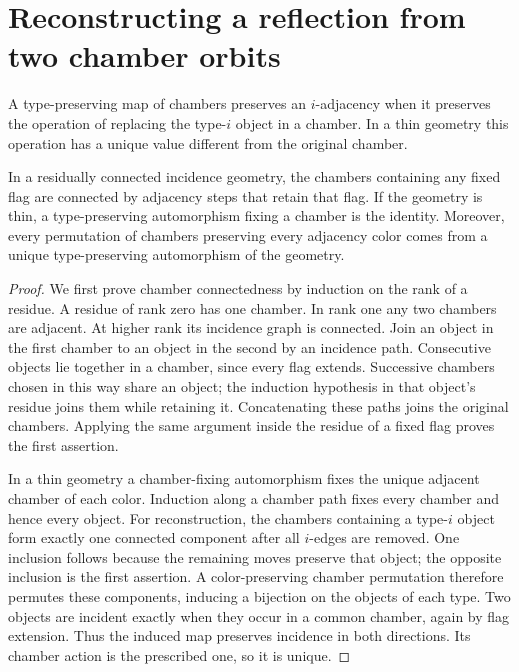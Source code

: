 \section{Reconstructing a reflection from two chamber orbits}
\label{sec:chambers}
A type-preserving map of chambers preserves an $i$-adjacency when it preserves the operation of replacing the type-$i$ object in a chamber. In a thin geometry this operation has a unique value different from the original chamber.

\begin{lemma}\label{lem:propagation}
In a residually connected incidence geometry, the chambers containing any fixed flag are connected by adjacency steps that retain that flag. If the geometry is thin, a type-preserving automorphism fixing a chamber is the identity. Moreover, every permutation of chambers preserving every adjacency color comes from a unique type-preserving automorphism of the geometry.
\end{lemma}
\begin{proof}
We first prove chamber connectedness by induction on the rank of a residue. A residue of rank zero has one chamber. In rank one any two chambers are adjacent. At higher rank its incidence graph is connected. Join an object in the first chamber to an object in the second by an incidence path. Consecutive objects lie together in a chamber, since every flag extends. Successive chambers chosen in this way share an object; the induction hypothesis in that object's residue joins them while retaining it. Concatenating these paths joins the original chambers. Applying the same argument inside the residue of a fixed flag proves the first assertion.

In a thin geometry a chamber-fixing automorphism fixes the unique adjacent chamber of each color. Induction along a chamber path fixes every chamber and hence every object. For reconstruction, the chambers containing a type-$i$ object form exactly one connected component after all $i$-edges are removed. One inclusion follows because the remaining moves preserve that object; the opposite inclusion is the first assertion. A color-preserving chamber permutation therefore permutes these components, inducing a bijection on the objects of each type. Two objects are incident exactly when they occur in a common chamber, again by flag extension. Thus the induced map preserves incidence in both directions. Its chamber action is the prescribed one, so it is unique.
\end{proof}

